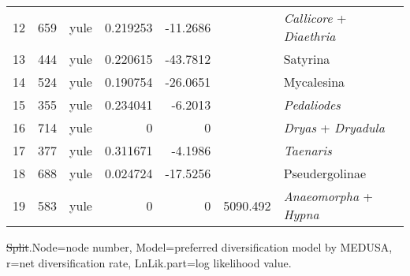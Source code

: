 \documentclass[10pt]{article}
\providecommand{\DIFaddtex}[1]{{\protect\color{blue}\uwave{#1}}} %
\providecommand{\DIFdeltex}[1]{{\protect\color{red}\sout{#1}}}                      %
\providecommand{\DIFaddFL}[1]{\DIFadd{#1}} %
\providecommand{\DIFdelFL}[1]{\DIFdel{#1}} %
\providecommand{\DIFaddbeginFL}{} %
\providecommand{\DIFaddendFL}{} %
\providecommand{\DIFdelbeginFL}{} %
\providecommand{\DIFdelendFL}{} %
\providecommand{\DIFadd}[1]{\texorpdfstring{\DIFaddtex{#1}}{#1}} %
\providecommand{\DIFdel}[1]{\texorpdfstring{\DIFdeltex{#1}}{}} %
\begin{document}
\begin{table}[!h]
\begin{tabular}{lccrrcl}
12              & 659        & yule  & 0.219253   & -11.2686   &          & \emph{Callicore} + \emph{Diaethria}                        \\
13              & 444        & yule  & 0.220615   & -43.7812   &          & Satyrina                                                   \\
14              & 524        & yule  & 0.190754   & -26.0651   &          & Mycalesina                                                 \\
15              & 355        & yule  & 0.234041   & -6.2013    &          & \emph{Pedaliodes}                                          \\
16              & 714        & yule  & 0          & 0          &          & \emph{Dryas} + \emph{Dryadula}                             \\
17              & 377        & yule  & 0.311671   & -4.1986    &          & \emph{Taenaris}                                            \\
18              & 688        & yule  & 0.024724   & -17.5256   &          & Pseudergolinae                                             \\
19              & 583        & yule  & 0          & 0          & 5090.492 & \emph{Anaeomorpha} + \emph{Hypna}                                       
\end{tabular}
\begin{flushleft}\DIFdelbeginFL \DIFdelFL{Split}\DIFdelendFL \DIFaddbeginFL \DIFaddFL{Shift}\DIFaddendFL .Node=node number, Model=preferred diversification model by MEDUSA, r=net diversification rate, LnLik.part=log likelihood value.
\end{flushleft}
\end{table}
\end{document}
